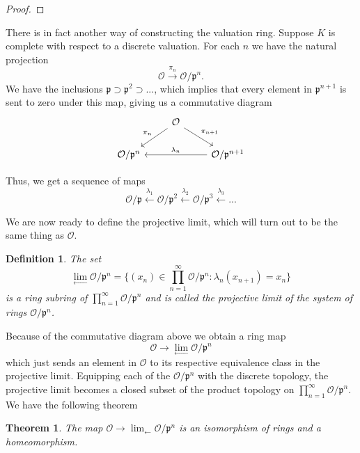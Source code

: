 \documentclass{article}
\newtheorem{theorem}{Theorem}[section]
\newtheorem{definition}{Definition}[section]
\newcommand{\mfrak}[1]{\mathfrak{#1}}
\newcommand{\mcal}[1]{\mathcal{#1}}
\begin{document}
\begin{proof}
    
\end{proof}
There is in fact another way of constructing the valuation ring. Suppose $K$ is complete with respect to a discrete valuation. For each $n$ we have the natural projection 
$$\mcal O \xrightarrow{\pi_n} \mcal O / \mfrak p^n.$$ 
We have the inclusions $\mfrak p \supset \mfrak p^2 \supset ...$, which implies that every element in $\mfrak p^{n+1}$ is sent to zero under this map, giving us a commutative diagram
$$\begin{tikzcd}
    & \mcal O \arrow[ld, "\pi_{n}"'] \arrow[rd, "\pi_{n+1}"] & \\
    \mcal O / \mfrak p^{n} & & \mcal O / \mfrak p^{n+1} \arrow[ll, "\lambda_{n}"']
\end{tikzcd}$$


Thus, we get a sequence of maps 
$$\mcal O / \mfrak p \xleftarrow {\lambda_1} \mcal O / \mfrak p^2 \xleftarrow {\lambda_2} \mcal O / \mfrak p^3 \xleftarrow {\lambda_3} ...$$

We are now ready to define the projective limit, which will turn out to be the same thing as $\mcal O$.

\begin{definition}
    The set
    $$\lim_{\leftarrow} \mcal O / \mfrak p^n = \{ (x_n) \in \prod_{n=1}^\infty \mcal O / \mfrak p^n : \lambda_n(x_{n+1}) = x_n \}$$
    is a ring subring of $\prod_{n=1}^\infty \mcal O / \mfrak p^n$ and is called the projective limit of the system of rings $\mcal O / \mfrak p^n$.
\end{definition}

Because of the commutative diagram above we obtain a ring map 
$$\mcal O \to \lim_{\leftarrow} \mcal O / \mfrak p^n$$
which just sends an element in $\mcal O$ to its respective equivalence class in the projective limit. Equipping each of the $\mcal O / \mfrak p^n$ with the discrete topology, the projective limit becomes a closed subset of the product topology on $\prod_{n=1}^\infty \mcal O / \mfrak p^n$. We have the following theorem

\begin{theorem}
    The map $\mcal O \to \lim_{\leftarrow} \mcal O / \mfrak p^n$ is an isomorphism of rings and a homeomorphism.
\end{theorem}
\end{document}
